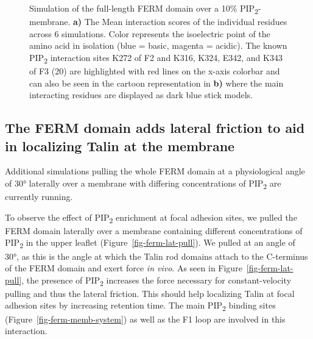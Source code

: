 \documentclass[
  letterpaper,
  DIV=11,
  numbers=noendperiod]{scrartcl}
\begin{document}
\begin{figure}
\begin{minipage}[t]{\linewidth}
{}

\subcaption{\label{fig-ferm-memb-system}~}
\end{minipage}%

\caption{\label{fig-ferm-further}Simulation of the full-length FERM
domain over a 10\% PIP\textsubscript{2}-membrane. \textbf{a)} The Mean
interaction scores of the individual residues across 6 simulations.
Color represents the isoelectric point of the amino acid in isolation
(blue = basic, magenta = acidic). The known PIP\textsubscript{2}
interaction sites K272 of F2 and K316, K324, E342, and K343 of F3 (20)
are highlighted with red lines on the x-axis colorbar and can also be
seen in the cartoon representation in \textbf{b)} where the main
interacting residues are displayed as dark blue stick models.}

\end{figure}

\hypertarget{the-ferm-domain-adds-lateral-friction-to-aid-in-localizing-talin-at-the-membrane}{%
\subsection{The FERM domain adds lateral friction to aid in localizing
Talin at the
membrane}\label{the-ferm-domain-adds-lateral-friction-to-aid-in-localizing-talin-at-the-membrane}}

\begin{tcolorbox}[standard jigsaw,colframe=quarto-callout-note-color-frame, title=\textcolor{quarto-callout-note-color}{\faInfo}\hspace{0.5em}Note, titlerule=0mm, bottomrule=.15mm, toprule=.15mm, toptitle=1mm, arc=.35mm, bottomtitle=1mm, rightrule=.15mm, leftrule=.75mm, left=2mm, colback=white, opacitybacktitle=0.6, coltitle=black, colbacktitle=quarto-callout-note-color!10!white, opacityback=0]
Additional simulations pulling the whole FERM domain at a physiological
angle of 30° laterally over a membrane with differing concentrations of
PIP\textsubscript{2} are currently running.
\end{tcolorbox}

To observe the effect of PIP\textsubscript{2} enrichment at focal
adhesion sites, we pulled the FERM domain laterally over a membrane
containing different concentrations of PIP\textsubscript{2} in the upper
leaflet (Figure~\ref{fig-ferm-lat-pull}). We pulled at an angle of 30°,
as this is the angle at which the Talin rod domains attach to the
C-terminus of the FERM domain and exert force \emph{in vivo}. As seen in
Figure~\ref{fig-ferm-lat-pull}, the presence of PIP\textsubscript{2}
increases the force necessary for constant-velocity pulling and thus the
lateral friction. This should help localizing Talin at focal adhesion
sites by increasing retention time. The main PIP\textsubscript{2}
binding sites (Figure~\ref{fig-ferm-memb-system}) as well as the F1 loop
are involved in this interaction.
\end{document}
